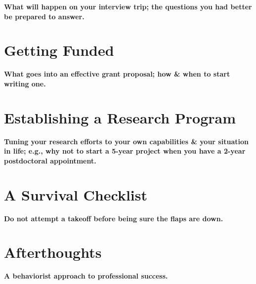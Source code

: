 \documentclass{article}
\numberwithin{equation}{section}
\begin{document}
\begin{center}
	\textsf{\bf What will happen on your interview trip; the questions you had better be prepared to answer.}
\end{center}


\section{Getting Funded}

\begin{center}
	\textsf{\bf What goes into an effective grant proposal; how \& when to start writing one.}
\end{center}


\section{Establishing a Research Program}

\begin{center}
	\textsf{\bf Tuning your research efforts to your own capabilities \& your situation in life; e.g., why not to start a 5-year project when you have a 2-year postdoctoral appointment.}
\end{center}


\section{A Survival Checklist}

\begin{center}
	\textsf{\bf Do not attempt a takeoff before being sure the flaps are down.}
\end{center}


\section{Afterthoughts}

\begin{center}
	\textsf{\bf A behaviorist approach to professional success.}
\end{center}


\printbibliography[heading=bibintoc]
	
\end{document}
